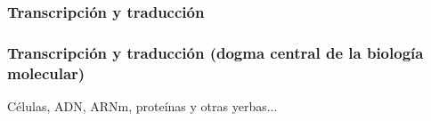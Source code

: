 \documentclass[serif,9pt, t]{beamer}
\begin{document}
\subsubsection*{Transcripción y traducción}
\begin{frame}\frametitle{Transcripción y traducción (dogma central de la biología molecular)}
\centering 
Células, ADN, ARNm, proteínas y otras yerbas...
\begin{figure}[t]
  \centering
\end{figure}

\end{frame}
\end{document}
